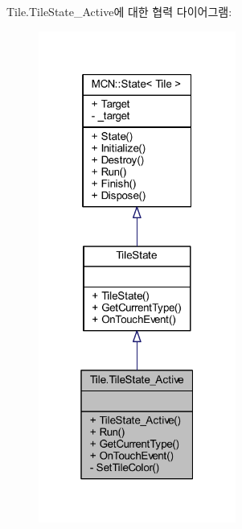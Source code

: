 Tile.\+Tile\+State\+\_\+\+Active에 대한 협력 다이어그램\+:\nopagebreak
\begin{figure}[H]
\begin{center}
\leavevmode
\includegraphics[width=184pt]{class_tile_1_1_tile_state___active__coll__graph}
\end{center}
\end{figure}
